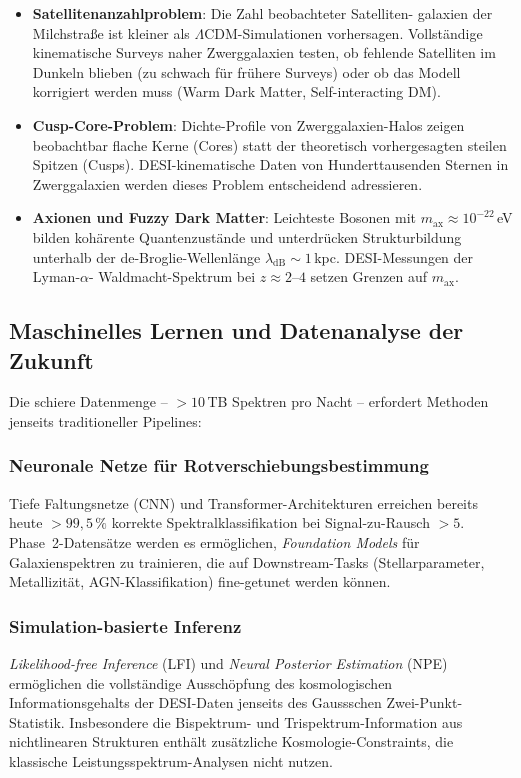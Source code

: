 ﻿\documentclass[a4paper,12pt]{article}
\theoremstyle{definition}
\theoremstyle{remark}
\begin{document}
\begin{itemize}
  \item \textbf{Satellitenanzahlproblem}: Die Zahl beobachteter Satelliten-
    galaxien der Milchstraße ist kleiner als $\Lambda$CDM-Simulationen vorhersagen.
    Vollständige kinematische Surveys naher Zwerggalaxien testen, ob fehlende
    Satelliten im Dunkeln blieben (zu schwach für frühere Surveys) oder ob
    das Modell korrigiert werden muss (Warm Dark Matter, Self-interacting DM).
  \item \textbf{Cusp-Core-Problem}: Dichte-Profile von Zwerggalaxien-Halos zeigen
    beobachtbar flache Kerne (Cores) statt der theoretisch vorhergesagten
    steilen Spitzen (Cusps). DESI-kinematische Daten von Hunderttausenden
    Sternen in Zwerggalaxien werden dieses Problem entscheidend adressieren.
  \item \textbf{Axionen und Fuzzy Dark Matter}: Leichteste Bosonen mit
    $m_\mathrm{ax} \approx 10^{-22}$\,eV bilden kohärente Quantenzustände
    und unterdrücken Strukturbildung unterhalb der de-Broglie-Wellenlänge
    $\lambda_\mathrm{dB} \sim 1$\,kpc. DESI-Messungen der Lyman-$\alpha$-
    Waldmacht-Spektrum bei $z \approx 2$--$4$ setzen Grenzen auf $m_\mathrm{ax}$.
\end{itemize}

\subsection{Maschinelles Lernen und Datenanalyse der Zukunft}

Die schiere Datenmenge -- $>10$\,TB Spektren pro Nacht -- erfordert
Methoden jenseits traditioneller Pipelines:

\subsubsection*{Neuronale Netze für Rotverschiebungsbestimmung}
Tiefe Faltungsnetze (CNN) und Transformer-Architekturen erreichen bereits heute
$> 99{,}5\,\%$ korrekte Spektralklassifikation bei Signal-zu-Rausch $> 5$.
Phase~2-Datensätze werden es ermöglichen, \textit{Foundation Models} für
Galaxienspektren zu trainieren, die auf Downstream-Tasks (Stellarparameter,
Metallizität, AGN-Klassifikation) fine-getunet werden können.

\subsubsection*{Simulation-basierte Inferenz}
\textit{Likelihood-free Inference} (LFI) und \textit{Neural Posterior Estimation}
(NPE) ermöglichen die vollständige Ausschöpfung des kosmologischen
Informationsgehalts der DESI-Daten jenseits des Gaussschen Zwei-Punkt-Statistik.
Insbesondere die Bispektrum- und Trispektrum-Information aus nichtlinearen
Strukturen enthält zusätzliche Kosmologie-Constraints, die klassische
Leistungsspektrum-Analysen nicht nutzen.
\end{document}
